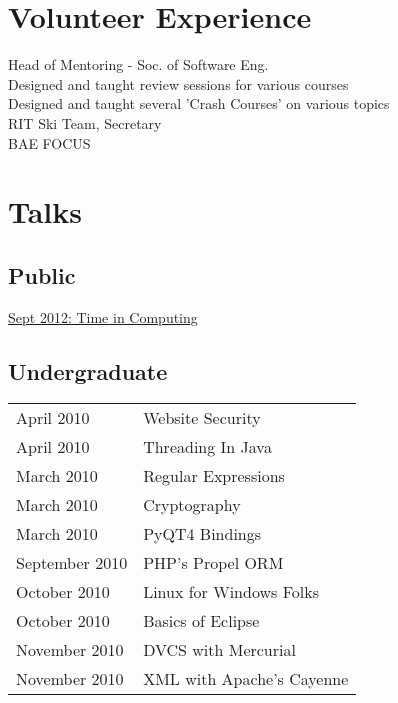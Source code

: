 \documentclass[letterpaper]{article} %
\newcommand{\sectionspace}{\vspace{8pt}} %
\begin{document}

\newpage %

\begin{minipage}[t]{0.40\textwidth} %

\section{Volunteer Experience}
Head of Mentoring - Soc. of Software Eng.\\
\textbullet{} Designed and taught review sessions for various courses \\
\textbullet{} Designed and taught several 'Crash Courses' on various topics \\
RIT Ski Team, Secretary \\
BAE FOCUS \\

\sectionspace

\section{Talks}

\subsection{Public}
\href{https://www.youtube.com/watch?v=bisFnj8YqW4}{Sept 2012: Time in Computing}

\sectionspace

\subsection{Undergraduate}
\begin{tabular}{ll}
April 2010 & Website Security \\
April 2010 & Threading In Java \\
March 2010 & Regular Expressions \\
March 2010 & Cryptography \\
March 2010 & PyQT4 Bindings \\
September 2010 & PHP's Propel ORM \\
October 2010 & Linux for Windows Folks \\
October 2010 & Basics of Eclipse \\
November 2010 & DVCS with Mercurial \\
November 2010 & XML with Apache's Cayenne \\
\end{tabular}

\end{minipage} %
\end{document}
